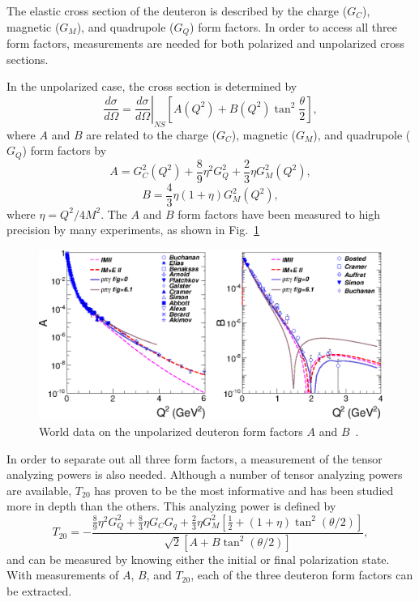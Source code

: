 
The elastic cross section of the deuteron is described by the charge ($G_C$), magnetic ($G_M$), and quadrupole ($G_Q$) form factors. In order to access all three form factors, measurements are needed for both polarized and unpolarized cross sections. 

In the unpolarized case, the cross section is determined by
\begin{equation}
\frac{d\sigma}{d\Omega} = \left. \frac{d\sigma}{d\Omega}\right\vert_{NS}\left[A(Q^2)  + B(Q^2)\tan^2\frac{\theta}{2}  \right],
\end{equation}
where $A$ and $B$ are related to the charge ($G_C$), magnetic ($G_M$), and quadrupole ($G_Q$) form factors by
\begin{equation}
A=G_C^2(Q^2)+\frac{8}{9} \eta ^2 G_Q^2 + \frac{2}{3} \eta G_M^2(Q^2),
\end{equation}
\begin{equation}
B=\frac{4}{3}\eta (1+\eta )G_M^2(Q^2),
\end{equation}
where $\eta=Q^2/4M^2$. The $A$ and $B$ form factors have been measured to high precision by many experiments, as shown in Fig.~\ref{ab-ff}

\begin{figure}
\begin{center}
\includegraphics{figs/ab-ff.eps} 
\caption{\label{ab-ff}World data on the unpolarized deuteron form factors $A$ and $B$~\cite{Holt:2012gg}.}
\end{center}
\end{figure}

In order to separate out all three form factors, a measurement of the tensor analyzing powers is also needed. Although a number of tensor analyzing powers are available, $T_{20}$ has proven to be the most informative and has been studied more in depth than the others. This analyzing power is defined by
\begin{equation}
T_{20} = -\frac{\frac{8}{9}\eta^2 G^2_Q + \frac{8}{3} \eta G_C G_q + \frac{2}{3} \eta G_M^2\left[\frac{1}{2} + (1 + \eta) \tan^2(\theta / 2) \right]}{\sqrt{2} [A + B\tan^2(\theta / 2)]},
\end{equation}
and can be measured by knowing either the initial or final polarization state. With measurements of $A$, $B$, and $T_{20}$, each of the three deuteron form factors can be extracted.

